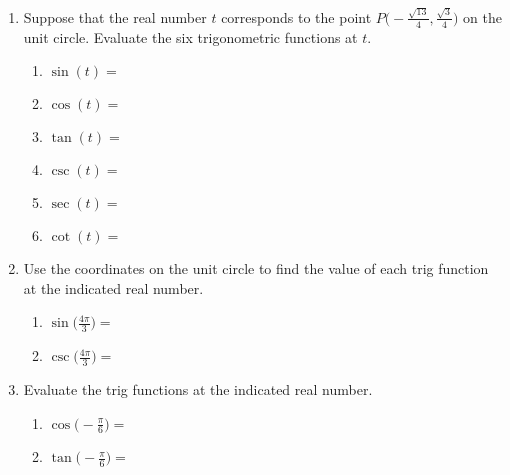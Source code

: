 


\begin{enumerate}
\item  Suppose that the real number $t$ corresponds to the point $\displaystyle P\Big(-\frac{\sqrt{13}}{4},\frac{\sqrt{3}}{4}\Big)$ on the unit circle.  Evaluate the six trigonometric functions at $t$.
\begin{enumerate}

\item $\sin(t)=$\vfill
\item $\cos(t)=$\vfill
\item $\tan(t)=$\vfill
\item $\csc(t)=$\vfill
\item $\sec(t)=$\vfill
\item $\cot(t)=$\vfill
\end{enumerate}




\newpage


\item Use the coordinates on the unit circle to find the value of each trig function at the indicated real number.
\begin{enumerate}
\item $\displaystyle \sin\Big(\frac{4\pi}{3}\Big)=$\vfill
\item $\displaystyle \csc\Big(\frac{4\pi}{3}\Big)=$\vfill
\end{enumerate}

\item  Evaluate the trig functions at the indicated real number.
\begin{enumerate}
\item $\displaystyle \cos\Big(-\frac{\pi}{6}\Big)=$\vfill
\item $\displaystyle \tan\Big(-\frac{\pi}{6}\Big)=$\vfill
\end{enumerate}




\end{enumerate}



